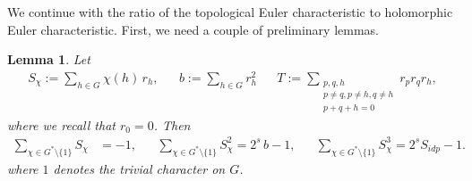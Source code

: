 \documentclass[12pt,twoside,]{amsart}
\theoremstyle{plain}
\newtheorem{lemma}[theorem]{Lemma}
\theoremstyle{definition}
\begin{document}
We continue with the ratio of the topological Euler characteristic to holomorphic Euler characteristic. First, we need a couple of preliminary lemmas.
\begin{lemma}\label{lemma:sum_s_chi}
Let
\begin{align*}
S_{\chi} := \sum_{h \in G} \chi(h)\, r_h,
&&
b := \sum_{h \in G} r_h^2
&& 
T := \sum_{\substack{p,q,h \\ 
p \neq q, p \neq h, q \neq h
\\
p+q+h = 0}}
r_p r_q r_h,
\end{align*}
where we recall that $r_0=0$.
Then
\begin{align*}
\sum_{\chi \in G^{\ast}
\setminus \{1 \}
} S_{\chi} &= -1,
&&
\sum_{\chi \in G^{\ast}
\setminus \{1 \}
} S_{\chi}^2 = 2^s\, b - 1,
&&
\sum_{\chi \in G^{\ast}
\setminus \{1 \}
} S_{\chi}^3
= 2^s S_{idp} - 1.
\end{align*}
where $1$ denotes the trivial character on $G$.

\end{lemma}
\end{document}

